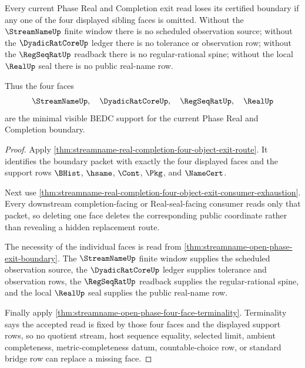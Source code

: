 \begin{theorem}
\label{thm:streamname-real-completion-four-object-exit-minimality}
Every current Phase Real and Completion exit read loses its certified boundary if any one of the four displayed sibling faces is omitted. Without the $\StreamNameUp$ finite window there is no scheduled observation source; without the $\DyadicRatCoreUp$ ledger there is no tolerance or observation row; without the $\RegSeqRatUp$ readback there is no regular-rational spine; without the local $\RealUp$ seal there is no public real-name row.

Thus the four faces
$$
\StreamNameUp,\quad \DyadicRatCoreUp,\quad \RegSeqRatUp,\quad \RealUp
$$
are the minimal visible BEDC support for the current Phase Real and Completion boundary.
\end{theorem}
\begin{proof}
Apply \autoref{thm:streamname-real-completion-four-object-exit-route}. It identifies the boundary packet with exactly the four displayed faces and the support rows $\BHist$, $\hsame$, $\Cont$, $\Pkg$, and $\NameCert$.

Next use \autoref{thm:streamname-real-completion-four-object-exit-consumer-exhaustion}. Every downstream completion-facing or Real-seal-facing consumer reads only that packet, so deleting one face deletes the corresponding public coordinate rather than revealing a hidden replacement route.

The necessity of the individual faces is read from \autoref{thm:streamname-open-phase-exit-boundary}. The $\StreamNameUp$ finite window supplies the scheduled observation source, the $\DyadicRatCoreUp$ ledger supplies tolerance and observation rows, the $\RegSeqRatUp$ readback supplies the regular-rational spine, and the local $\RealUp$ seal supplies the public real-name row.

Finally apply \autoref{thm:streamname-open-phase-four-face-terminality}. Terminality says the accepted read is fixed by those four faces and the displayed support rows, so no quotient stream, host sequence equality, selected limit, ambient completeness, metric-completeness datum, countable-choice row, or standard bridge row can replace a missing face.
\end{proof}

